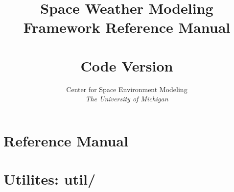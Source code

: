 \documentclass[twoside,10pt]{book}
\title{Space Weather Modeling Framework Reference Manual \\ 
       \hfill \\
       \large Code Version \SWMFVERSION}}
\author{Center for Space Environment Modeling\\
       {\it The University of Michigan}}
\begin{document}
\pagestyle{fancy}
\lhead[\fancyplain{}{\bfseries\thepage}]{\fancyplain{}{\bfseries\rightmark}}
\rhead[\fancyplain{}{\bfseries\leftmark}]{\fancyplain{}{\bfseries\thepage}}
\cfoot{}

\maketitle

\tableofcontents

\chapter{Reference Manual}



\chapter{Utilites: util/}


\end{document}
